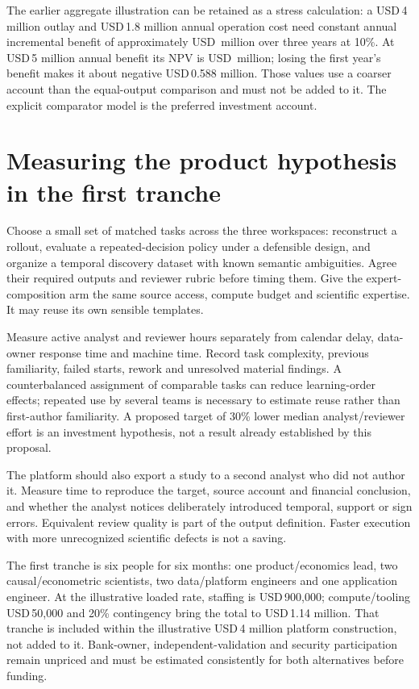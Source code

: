 The earlier aggregate illustration can be retained as a stress calculation:
a USD\,4 million outlay and USD\,1.8 million annual operation cost need
constant annual incremental benefit of approximately
USD\,\NumBreakEven{} million over three years at 10\%.
At USD\,5 million annual benefit its NPV is USD\,\NumBaseNPV{} million;
losing the first year's benefit makes it about negative USD\,0.588 million.
Those values use a coarser account than the equal-output comparison and
must not be added to it. The explicit comparator model is the preferred
investment account.

\section{Measuring the product hypothesis in the first tranche}
Choose a small set of matched tasks across the three workspaces: reconstruct
a rollout, evaluate a repeated-decision policy under a defensible design,
and organize a temporal discovery dataset with known semantic ambiguities.
Agree their required outputs and reviewer rubric before timing them.
Give the expert-composition arm the same source access, compute budget and
scientific expertise. It may reuse its own sensible templates.

Measure active analyst and reviewer hours separately from calendar delay,
data-owner response time and machine time. Record task complexity,
previous familiarity, failed starts, rework and unresolved material findings.
A counterbalanced assignment of comparable tasks can reduce learning-order
effects; repeated use by several teams is necessary to estimate reuse
rather than first-author familiarity. A proposed target of 30\% lower
median analyst/reviewer effort is an investment hypothesis, not a result
already established by this proposal.

The platform should also export a study to a second analyst who did not
author it. Measure time to reproduce the target, source account and
financial conclusion, and whether the analyst notices deliberately
introduced temporal, support or sign errors. Equivalent review quality is
part of the output definition. Faster execution with more unrecognized
scientific defects is not a saving.

The first tranche is six people for six months: one product/economics lead,
two causal/econometric scientists, two data/platform engineers and one
application engineer. At the illustrative loaded rate, staffing is
USD\,900,000; compute/tooling USD\,50,000 and 20\% contingency bring the
total to USD\,1.14 million. That tranche is included within the illustrative
USD\,4 million platform construction, not added to it. Bank-owner,
independent-validation and security participation remain unpriced and
must be estimated consistently for both alternatives before funding.

